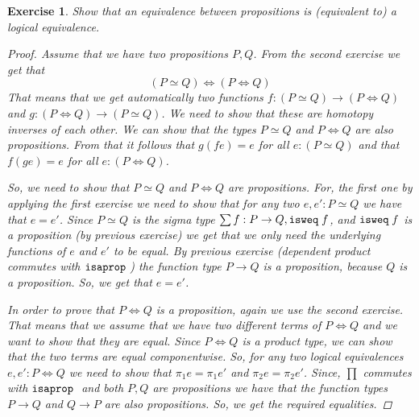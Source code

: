 \documentclass[10pt]{article}
\newtheorem{exercise}{Exercise}
\begin{document}
\begin{exercise}
Show that an equivalence between propositions
is (equivalent to) a logical equivalence.
\begin{proof}
Assume that we have two propositions $P, Q$.
From the second exercise we get that
\[
 (P \simeq Q) \iff (P \iff Q)
\]
That means that we get automatically two
functions $f : (P \simeq Q) \to (P \iff Q)$
and $g : (P \iff Q) \to (P \simeq Q)$. We
need to show that these are homotopy
inverses of each other.
We can show that the types $P \simeq Q$
and $P \iff Q$ are also propositions.
From that it follows that $g (f e) = e$
for all $e : (P \simeq Q)$ and that
$f (g e) = e$ for all $e : (P \iff Q)$.

So, we need to show that $P \simeq Q$
and $P \iff Q$ are propositions. For,
the first one by applying the first
exercise we need to show that for any
two $e, e' : P \simeq Q$ we have that
$e = e'$. Since $P \simeq Q$ is the sigma type
$\sum f : P \to Q, \mathtt{isweq \;} f$, and $\mathtt{isweq \;} f$
is a proposition (by previous exercise)
we get that we only need the underlying
functions of $e$ and $e'$ to be equal. By
previous exercise (dependent product commutes with $\mathtt{isaprop \;}$)
the function type $P \to Q$ is a proposition,
because $Q$ is a proposition. So, we get that
$e = e'$.

In order to prove that $P \iff Q$ is a proposition,
again we use the second exercise. That means that
we assume that we have two different terms of
$P \iff Q$ and we want to show that they are equal.
Since $P \iff Q$ is a product type, we can show
that the two terms are equal componentwise.
So, for any two logical equivalences $e, e' : P \iff Q$
we need to show that $\pi_1 e = \pi_1 e'$
and $\pi_2 e = \pi_2 e'$. Since, $\prod$
commutes with $\mathtt{isaprop \;}$ and both $P, Q$ are
propositions we have that the function types
$P \to Q$ and $Q \to P$ are also propositions.
So, we get the required equalities.

\end{proof}
\end{exercise}
\end{document}
